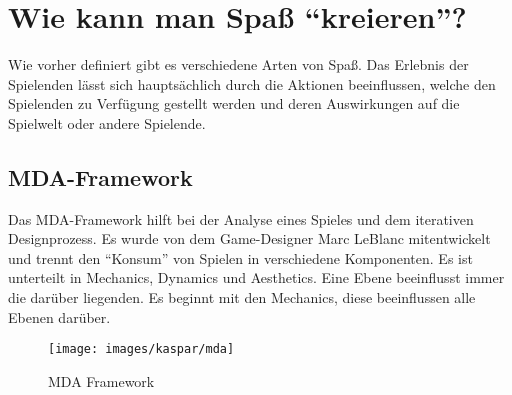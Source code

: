 \section{Wie kann man Spaß "`kreieren"'?}

Wie vorher definiert gibt es verschiedene Arten von Spaß. Das Erlebnis der Spielenden lässt sich hauptsächlich durch die Aktionen beeinflussen, welche den Spielenden zu Verfügung gestellt werden und deren Auswirkungen auf die Spielwelt oder andere Spielende.

\subsection{MDA-Framework}

Das MDA-Framework hilft bei der Analyse eines Spieles und dem iterativen Designprozess. Es wurde von dem Game-Designer Marc LeBlanc mitentwickelt und trennt den "`Konsum"' von Spielen in verschiedene Komponenten\cite{_mda}. Es ist unterteilt in Mechanics, Dynamics und Aesthetics. Eine Ebene beeinflusst immer die darüber liegenden. Es beginnt mit den Mechanics, diese beeinflussen alle Ebenen darüber.

\begin{figure}[H]
	\centering
	\texttt{[image: images/kaspar/mda]}
	\caption{MDA Framework\cite{_mda}}
\end{figure}

